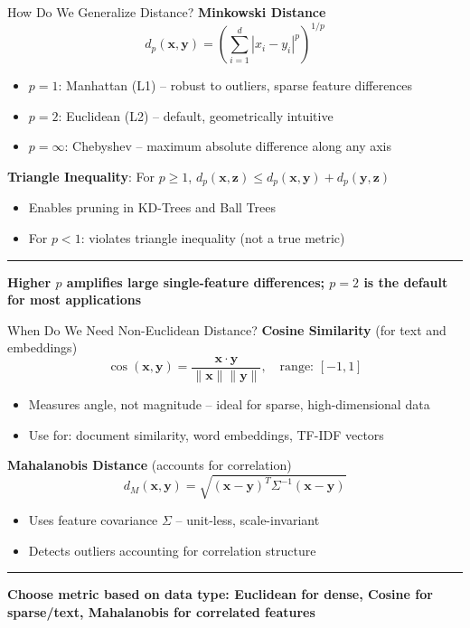 \documentclass[8pt,aspectratio=169]{beamer}
\newcommand{\bottomnote}[1]{%
\vfill
\vspace{-2mm}
\textcolor{mllavender2}{\rule{\textwidth}{0.4pt}}
\vspace{1mm}
\footnotesize
\textbf{#1}
}
\begin{document}
\begin{frame}[t]{How Do We Generalize Distance?}
\textbf{Minkowski Distance}
$$d_p(\mathbf{x}, \mathbf{y}) = \left(\sum_{i=1}^{d}|x_i - y_i|^p\right)^{1/p}$$
\vspace{0.3em}
\begin{itemize}
\item $p=1$: Manhattan (L1) -- robust to outliers, sparse feature differences
\item $p=2$: Euclidean (L2) -- default, geometrically intuitive
\item $p=\infty$: Chebyshev -- maximum absolute difference along any axis
\end{itemize}
\vspace{0.5em}
\textbf{Triangle Inequality}: For $p \geq 1$, $d_p(\mathbf{x}, \mathbf{z}) \leq d_p(\mathbf{x}, \mathbf{y}) + d_p(\mathbf{y}, \mathbf{z})$
\begin{itemize}
\item Enables pruning in KD-Trees and Ball Trees
\item For $p < 1$: violates triangle inequality (not a true metric)
\end{itemize}
\bottomnote{Higher $p$ amplifies large single-feature differences; $p=2$ is the default for most applications}
\end{frame}

\begin{frame}[t]{When Do We Need Non-Euclidean Distance?}
\textbf{Cosine Similarity} (for text and embeddings)
$$\cos(\mathbf{x}, \mathbf{y}) = \frac{\mathbf{x} \cdot \mathbf{y}}{\|\mathbf{x}\| \|\mathbf{y}\|}, \quad \text{range: } [-1, 1]$$
\begin{itemize}
\item Measures angle, not magnitude -- ideal for sparse, high-dimensional data
\item Use for: document similarity, word embeddings, TF-IDF vectors
\end{itemize}
\vspace{0.5em}
\textbf{Mahalanobis Distance} (accounts for correlation)
$$d_M(\mathbf{x}, \mathbf{y}) = \sqrt{(\mathbf{x}-\mathbf{y})^T \Sigma^{-1} (\mathbf{x}-\mathbf{y})}$$
\begin{itemize}
\item Uses feature covariance $\Sigma$ -- unit-less, scale-invariant
\item Detects outliers accounting for correlation structure
\end{itemize}
\bottomnote{Choose metric based on data type: Euclidean for dense, Cosine for sparse/text, Mahalanobis for correlated features}
\end{frame}
\end{document}
